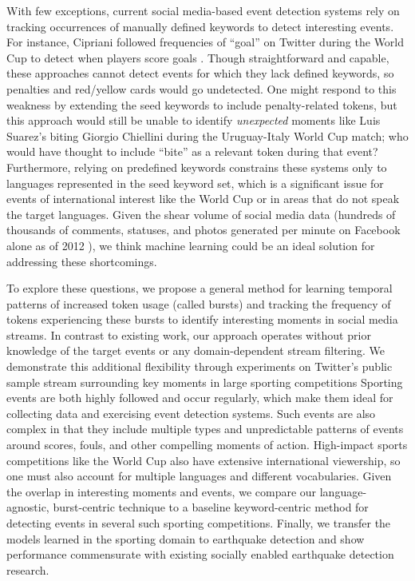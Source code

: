 \documentclass{sig-alternate}
\begin{document}
With few exceptions, current social media-based event detection systems rely on tracking occurrences of manually defined keywords to detect interesting events.
For instance, Cipriani followed frequencies of ``goal'' on Twitter during the World Cup to detect when players score goals \cite{Cipriani2014}.
Though straightforward and capable, these approaches cannot detect events for which they lack defined keywords, so penalties and red/yellow cards would go undetected.
One might respond to this weakness by extending the seed keywords to include penalty-related tokens, but this approach would still be unable to identify \emph{unexpected} moments like Luis Suarez's biting Giorgio Chiellini during the Uruguay-Italy World Cup match; who would have thought to include ``bite'' as a relevant token during that event?
Furthermore, relying on predefined keywords constrains these systems only to languages represented in the seed keyword set, which is a significant issue for events of international interest like the World Cup or in areas that do not speak the target languages.
Given the shear volume of social media data (hundreds of thousands of comments, statuses, and photos generated per minute on Facebook alone as of 2012 \cite{Pring2012}), we think machine learning could be an ideal solution for addressing these shortcomings.

To explore these questions, we propose a general method for learning temporal patterns of increased token usage (called bursts) and tracking the frequency of tokens experiencing these bursts to identify interesting moments in social media streams. 
In contrast to existing work, our approach operates without prior knowledge of the target events or any domain-dependent stream filtering.
We demonstrate this additional flexibility through experiments on Twitter's public sample stream surrounding key moments in large sporting competitions
Sporting events are both highly followed and occur regularly, which make them ideal for collecting data and exercising event detection systems.
Such events are also complex in that they include multiple types and unpredictable patterns of events around scores, fouls, and other compelling moments of action.
High-impact sports competitions like the World Cup also have extensive international viewership, so one must also account for multiple languages and different vocabularies.
Given the overlap in interesting moments and events, we compare our language-agnostic, burst-centric technique to a baseline keyword-centric method for detecting events in several such sporting competitions.
Finally, we transfer the models learned in the sporting domain to earthquake detection and show performance commensurate with existing socially enabled earthquake detection research.
\end{document}
